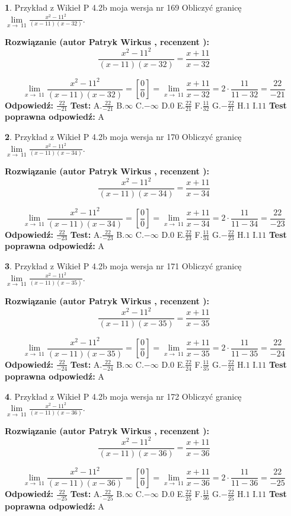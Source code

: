 \documentclass[12pt, a4paper]{article}
\theoremstyle{definition} %
\newtheorem{zad}{}
\newcommand{\zadStart}[1]{\begin{zad}#1\newline}
\newcommand{\zadStop}{\end{zad}}
\newcommand{\rozwStart}[2]{\noindent \textbf{Rozwiązanie (autor #1 , recenzent #2): }\newline}
\newcommand{\rozwStop}{\newline}
\newcommand{\odpStart}{\noindent \textbf{Odpowiedź:}\newline}
\newcommand{\odpStop}{\newline}
\newcommand{\testStart}{\noindent \textbf{Test:}\newline}
\newcommand{\testStop}{\newline}
\newcommand{\kluczStart}{\noindent \textbf{Test poprawna odpowiedź:}\newline}
\newcommand{\kluczStop}{\newline}
\begin{document}
\zadStart{Przykład z Wikieł P 4.2b moja wersja nr 169}
Obliczyć granicę $\lim\limits_{x\to\ 11}\frac{x^{2}-11^{2}}{(x-11)(x-32)}$.
\zadStop
\rozwStart{Patryk Wirkus}{}
$$\frac{x^{2}-11^{2}}{(x-11)(x-32)}=\frac{x+11}{x-32}$$

$$\lim\limits_{x\to\ 11}\frac{x^{2}-11^{2}}{(x-11)(x-32)}=[\frac{0}{0}]=\lim\limits_{x\to\ 11}\frac{x+11}{x-32}=2 \cdot \frac{11}{11-32} = \frac{22}{-21}$$
\rozwStop
\odpStart
$\frac{22}{-21}$
\odpStop
\testStart
A.$\frac{22}{-21}$
B.$\infty$
C.$-\infty$
D.$0$
E.$\frac{22}{21}$
F.$\frac{11}{32}$
G.$-\frac{22}{21}$
H.$1$
I.$11$
\testStop
\kluczStart
A
\kluczStop



\zadStart{Przykład z Wikieł P 4.2b moja wersja nr 170}
Obliczyć granicę $\lim\limits_{x\to\ 11}\frac{x^{2}-11^{2}}{(x-11)(x-34)}$.
\zadStop
\rozwStart{Patryk Wirkus}{}
$$\frac{x^{2}-11^{2}}{(x-11)(x-34)}=\frac{x+11}{x-34}$$

$$\lim\limits_{x\to\ 11}\frac{x^{2}-11^{2}}{(x-11)(x-34)}=[\frac{0}{0}]=\lim\limits_{x\to\ 11}\frac{x+11}{x-34}=2 \cdot \frac{11}{11-34} = \frac{22}{-23}$$
\rozwStop
\odpStart
$\frac{22}{-23}$
\odpStop
\testStart
A.$\frac{22}{-23}$
B.$\infty$
C.$-\infty$
D.$0$
E.$\frac{22}{23}$
F.$\frac{11}{34}$
G.$-\frac{22}{23}$
H.$1$
I.$11$
\testStop
\kluczStart
A
\kluczStop



\zadStart{Przykład z Wikieł P 4.2b moja wersja nr 171}
Obliczyć granicę $\lim\limits_{x\to\ 11}\frac{x^{2}-11^{2}}{(x-11)(x-35)}$.
\zadStop
\rozwStart{Patryk Wirkus}{}
$$\frac{x^{2}-11^{2}}{(x-11)(x-35)}=\frac{x+11}{x-35}$$

$$\lim\limits_{x\to\ 11}\frac{x^{2}-11^{2}}{(x-11)(x-35)}=[\frac{0}{0}]=\lim\limits_{x\to\ 11}\frac{x+11}{x-35}=2 \cdot \frac{11}{11-35} = \frac{22}{-24}$$
\rozwStop
\odpStart
$\frac{22}{-24}$
\odpStop
\testStart
A.$\frac{22}{-24}$
B.$\infty$
C.$-\infty$
D.$0$
E.$\frac{22}{24}$
F.$\frac{11}{35}$
G.$-\frac{22}{24}$
H.$1$
I.$11$
\testStop
\kluczStart
A
\kluczStop



\zadStart{Przykład z Wikieł P 4.2b moja wersja nr 172}
Obliczyć granicę $\lim\limits_{x\to\ 11}\frac{x^{2}-11^{2}}{(x-11)(x-36)}$.
\zadStop
\rozwStart{Patryk Wirkus}{}
$$\frac{x^{2}-11^{2}}{(x-11)(x-36)}=\frac{x+11}{x-36}$$

$$\lim\limits_{x\to\ 11}\frac{x^{2}-11^{2}}{(x-11)(x-36)}=[\frac{0}{0}]=\lim\limits_{x\to\ 11}\frac{x+11}{x-36}=2 \cdot \frac{11}{11-36} = \frac{22}{-25}$$
\rozwStop
\odpStart
$\frac{22}{-25}$
\odpStop
\testStart
A.$\frac{22}{-25}$
B.$\infty$
C.$-\infty$
D.$0$
E.$\frac{22}{25}$
F.$\frac{11}{36}$
G.$-\frac{22}{25}$
H.$1$
I.$11$
\testStop
\kluczStart
A
\kluczStop
\end{document}
